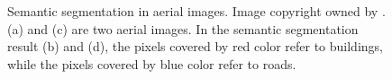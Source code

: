 \begin{figure}[!h]
{	}
    \caption[Semantic segmentation in aerial images]{Semantic segmentation in aerial images. Image copyright owned by \cite{mspascal}. (a) and (c) are two aerial images. In the semantic segmentation result (b) and (d), the pixels covered by red color refer to buildings, while the pixels covered by blue color refer to roads.}
	\label{fig:mspascal}
\end{figure}

